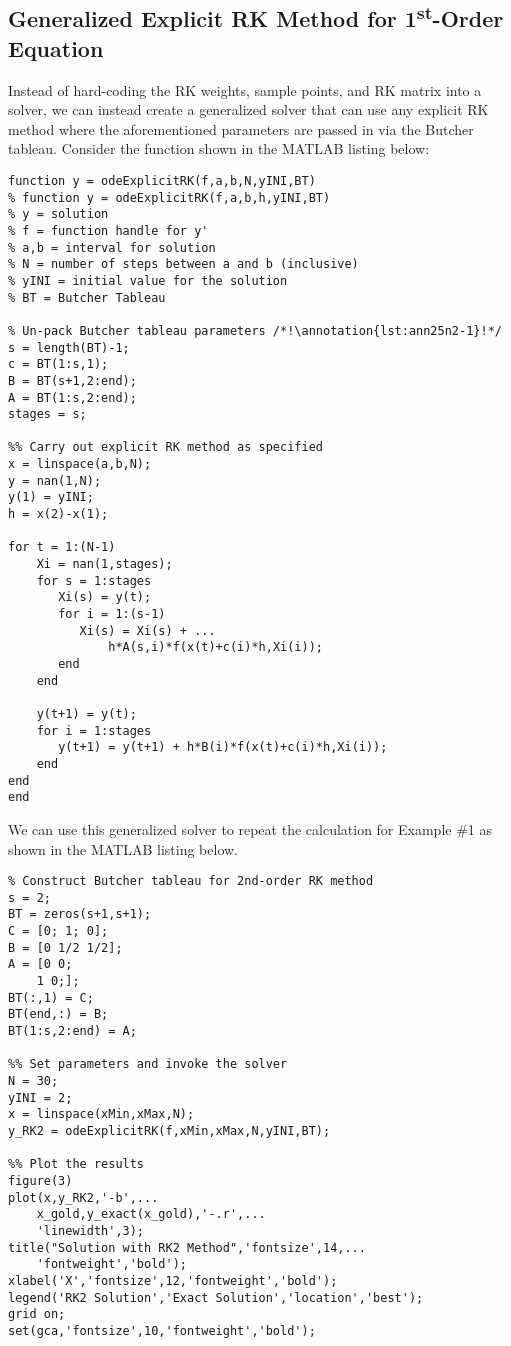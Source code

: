 \subsection{Generalized Explicit RK Method for 1\textsuperscript{st}-Order Equation}

Instead of hard-coding the RK weights, sample points, and RK matrix into a solver, we can instead create a generalized solver that can use any explicit RK method where the aforementioned parameters are passed in via the Butcher tableau.  Consider the function shown in the MATLAB listing below:
\begin{lstlisting}[style=myMatlab,name=lec25n-3]
function y = odeExplicitRK(f,a,b,N,yINI,BT)
% function y = odeExplicitRK(f,a,b,h,yINI,BT)
% y = solution
% f = function handle for y'
% a,b = interval for solution
% N = number of steps between a and b (inclusive)
% yINI = initial value for the solution
% BT = Butcher Tableau

% Un-pack Butcher tableau parameters /*!\annotation{lst:ann25n2-1}!*/
s = length(BT)-1;
c = BT(1:s,1);
B = BT(s+1,2:end);
A = BT(1:s,2:end);
stages = s;

%% Carry out explicit RK method as specified
x = linspace(a,b,N);
y = nan(1,N);
y(1) = yINI;
h = x(2)-x(1);

for t = 1:(N-1)
    Xi = nan(1,stages);    
    for s = 1:stages
       Xi(s) = y(t);
       for i = 1:(s-1)
          Xi(s) = Xi(s) + ...
              h*A(s,i)*f(x(t)+c(i)*h,Xi(i)); 
       end
    end
    
    y(t+1) = y(t);
    for i = 1:stages
       y(t+1) = y(t+1) + h*B(i)*f(x(t)+c(i)*h,Xi(i)); 
    end    
end
end
\end{lstlisting}

We can use this generalized solver to repeat the calculation for Example \#1 as shown in the MATLAB listing below.

\begin{lstlisting}[style=myMatlab,name=lec25n-4]
%% Use Generalized Explicit RK method based on Butcher Tableau
% Construct Butcher tableau for 2nd-order RK method
s = 2;
BT = zeros(s+1,s+1);
C = [0; 1; 0];
B = [0 1/2 1/2];
A = [0 0;
    1 0;];
BT(:,1) = C;
BT(end,:) = B;
BT(1:s,2:end) = A;

%% Set parameters and invoke the solver
N = 30;
yINI = 2;
x = linspace(xMin,xMax,N);
y_RK2 = odeExplicitRK(f,xMin,xMax,N,yINI,BT);

%% Plot the results
figure(3)
plot(x,y_RK2,'-b',...
    x_gold,y_exact(x_gold),'-.r',...
    'linewidth',3);
title("Solution with RK2 Method",'fontsize',14,...
    'fontweight','bold');
xlabel('X','fontsize',12,'fontweight','bold');
legend('RK2 Solution','Exact Solution','location','best');
grid on;
set(gca,'fontsize',10,'fontweight','bold');
\end{lstlisting}

